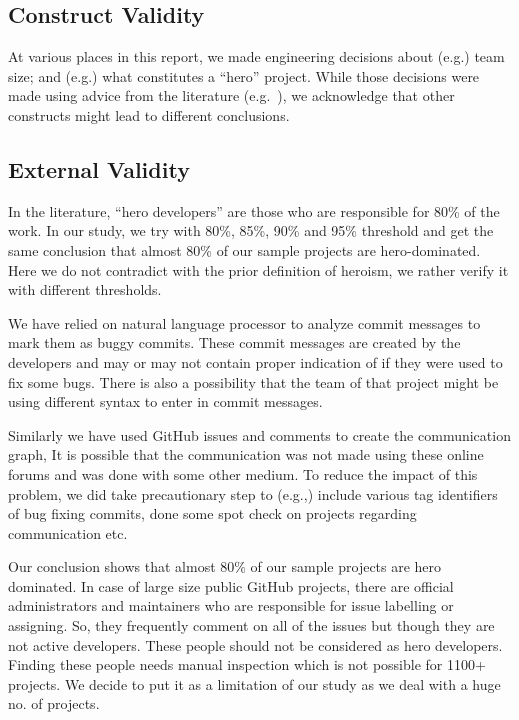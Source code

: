 \documentclass[sigconf,review]{acmart}
\begin{document}
         \subsection{Construct Validity} At various places in this report, we made engineering decisions about (e.g.) team size; and (e.g.) what constitutes a ``hero'' project. While those decisions were made using advice from the literature (e.g.~\cite{gautam2017empirical}), we acknowledge that other constructs might lead to different conclusions. 
     

\subsection{External Validity} 
In the literature, ``hero developers'' are those who are responsible for 80\% of the work. In our study, we try with 80\%, 85\%, 90\% and 95\% threshold and get the same conclusion that almost 80\% of our sample projects are hero-dominated. Here we do not contradict with the prior definition of heroism, we rather verify it with different thresholds.


We have relied on natural language processor to analyze commit messages to mark them as buggy commits. These commit messages are created by the developers and may or may not contain proper indication of if they were used to fix some bugs. There is also a possibility that the team of that project might be using different syntax to enter in commit messages.

Similarly we have used GitHub issues and comments to create the communication graph, It is possible that the communication was not made using these online forums and was done with some other medium. To reduce the impact of this problem, we  did take precautionary step to (e.g.,) include various tag identifiers of bug fixing commits, done some spot check on projects regarding communication etc.

Our conclusion shows that almost 80\% of our sample projects are hero dominated.  In case of large size public GitHub projects, there are official administrators and maintainers who are responsible for issue labelling or assigning. So, they frequently comment on all of the issues but though they are not active developers. These people should not be considered as hero developers. Finding these people needs manual inspection which is not possible for 1100+ projects. We decide to put it as a limitation of our study as we deal with a huge no. of projects.
    
 
\end{document}
